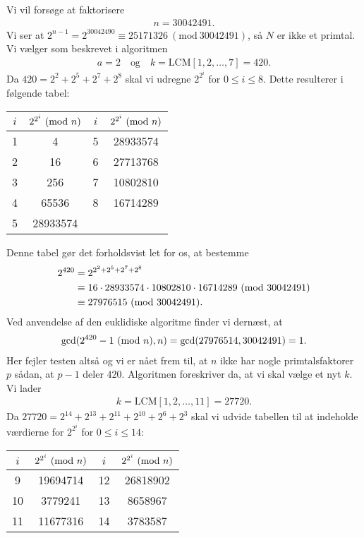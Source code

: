 \begin{example}
Vi vil forsøge at faktorisere 
\begin{align*}
	n = 30042491.
\end{align*}
Vi ser at $2^{n-1} = 2^{30042490} \equiv 25171326 \ (\textrm{mod}\ 30042491)$,
så $N$ er ikke et primtal. Vi vælger som beskrevet i algoritmen
\begin{align*}
	a = 2 \quad \text{og} \quad k = \mathrm{LCM}[1,2, \ldots, 7] = 420.
\end{align*}
Da $420 = 2^2 + 2^5 + 2^7 + 2^8$ skal vi udregne $2^{2^i}$ for 
$0 \leq i \leq 8$. Dette resulterer i følgende tabel:

\begin{center}
\begin{tabular}{c c c c}
$i$ & $2^{2^i} \ (\mathrm{mod} \ n)$ & $i$ & $2^{2^i} \ (\mathrm{mod} \ n)$ \\ 
\hline 
1 & 4 & 5 & 28933574 \\ 
2 & 16 & 6 & 27713768 \\ 
3 & 256 & 7 & 10802810 \\ 
4 & 65536 & 8 & 16714289 \\ 
5 & 28933574 & & 
\end{tabular} 
\end{center}
Denne tabel gør det forholdsvist let for os, at bestemme
\begin{align*}
	2^{420} &= 2^{2^2 + 2^5 + 2^7 + 2^8} \\
	&\equiv 16 \cdot 28933574 \cdot 10802810 \cdot 16714289
	\ (\mathrm{mod} \ 30042491) \\
	&\equiv 27976515 \ (\mathrm{mod} \ 30042491).
\end{align*}
Ved anvendelse af den euklidiske algoritme finder vi dernæst, at
\begin{align*}
	\mathrm{gcd}(2^{420} - 1 \ (\mathrm{mod} \ n), n) = \mathrm{gcd}(27976514, 30042491) = 1.
\end{align*}
Her fejler testen altså og vi er nået frem til, at $n$ ikke har nogle 
primtalsfaktorer $p$ sådan, at $p-1$ deler $420$. Algoritmen foreskriver da, at vi skal vælge et nyt $k$. Vi lader
\begin{align*}
	k = \mathrm{LCM}[1,2, \ldots, 11] = 27720.
\end{align*}
Da $27720 = 2^{14} + 2^{13} + 2^{11} + 2^{10} + 2^{6} + 2^3$ skal vi udvide tabellen til at indeholde værdierne for $2^{2^i}$ for $0 \leq i \leq 14$:

\begin{center}
\begin{tabular}{c c c c}
$i$ & $2^{2^i} \ (\mathrm{mod} \ n)$ & $i$ & $2^{2^i} \ (\mathrm{mod} \ n)$ \\ 
\hline 
9 & 19694714 & 12 & 26818902 \\ 
10 & 3779241 & 13 & 8658967 \\ 
11 & 11677316 & 14 & 3783587 \\ 
\end{tabular} 
\end{center}


\end{example}
